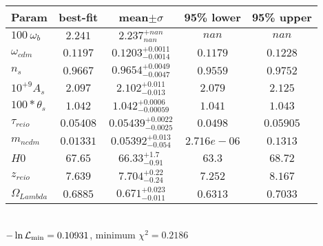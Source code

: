 \begin{tabular}{|l|c|c|c|c|} 
 \hline 
Param & best-fit & mean$\pm\sigma$ & 95\% lower & 95\% upper \\ \hline 
$100~\omega{}_{b }$ &$2.241$ & $2.237_{nan}^{+nan}$ & $nan$ & $nan$ \\ 
$\omega{}_{cdm }$ &$0.1197$ & $0.1203_{-0.0014}^{+0.0011}$ & $0.1179$ & $0.1228$ \\ 
$n_{s }$ &$0.9667$ & $0.9654_{-0.0047}^{+0.0049}$ & $0.9559$ & $0.9752$ \\ 
$10^{+9}A_{s }$ &$2.097$ & $2.102_{-0.013}^{+0.011}$ & $2.079$ & $2.125$ \\ 
$100*\theta{}_{s }$ &$1.042$ & $1.042_{-0.00059}^{+0.0006}$ & $1.041$ & $1.043$ \\ 
$\tau{}_{reio }$ &$0.05408$ & $0.05439_{-0.0025}^{+0.0022}$ & $0.0498$ & $0.05905$ \\ 
$m_{ncdm }$ &$0.01331$ & $0.05392_{-0.054}^{+0.013}$ & $2.716e-06$ & $0.1313$ \\ 
$H0$ &$67.65$ & $66.33_{-0.91}^{+1.7}$ & $63.3$ & $68.72$ \\ 
$z_{reio }$ &$7.639$ & $7.704_{-0.24}^{+0.22}$ & $7.252$ & $8.167$ \\ 
$\Omega{}_{Lambda }$ &$0.6885$ & $0.671_{-0.011}^{+0.023}$ & $0.6313$ & $0.7033$ \\ 
\hline 
 \end{tabular} \\ 
$-\ln{\cal L}_\mathrm{min} =0.10931$, minimum $\chi^2=0.2186$ \\ 
